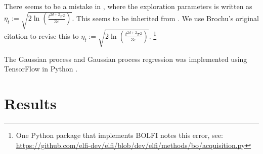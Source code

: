 There seems to be a mistake in \cite{gutmann_bayesian_2016}, where the
exploration parameters is written as
$\eta_t:= \sqrt{2\ln(\frac{t^{2d + 2}\pi^2}{3\varepsilon})}.$ This seems to be
inherited from \cite{brochu_tutorial_2010}. We use Brochu's original citation
\cite{srinivas_gaussian_2010} to revise this to
$\eta_t:= \sqrt{2\ln(\frac{t^{2d + 2}\pi^2}{3\varepsilon})}.$
\footnote{One Python package that implements BOLFI notes this error, see:
    \url{https://github.com/elfi-dev/elfi/blob/dev/elfi/methods/bo/acquisition.py}}

The Gaussian process and Gaussian process regression was implemented using
TensorFlow in Python \cite{abadi_tensorflow_2015}.

\section{Results}

